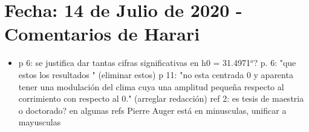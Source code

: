 \section{Fecha: 14 de Julio de 2020 - Comentarios de Harari}

\begin{itemize}
\done pag 2: no diría $\theta_{max} < 60^o$, diría $\theta < 60^o$ (o $\theta_max=60^o$)
\done p 2: la frase "la eficiencia completa se alcanza a partir de una energía mayor cercana a 1 EeV" me parece algo confusa, no queda claro si queres decir que la eficiencia completa es a energias mayores que 1 EeV u otra cosa, lo relevante seria destacar que el umbral de eficiencia completa es menor que con el disparo estandar  
\item p 6: se justifica dar tantas cifras significativas en  h0 = 31.4971$^o$? 
\done p. 6: "que estos los resultados "  (eliminar estos) 
\done p 11: "no esta centrada 0 y aparenta tener una modulación del clima cuya una amplitud pequeña respecto al corrimiento con respecto al 0." (arreglar redacción) 
\done ref 2: es tesis de maestria o doctorado? 
\done en algunas refs Pierre Auger está en minusculas, unificar a  mayusculas
\end{itemize}
